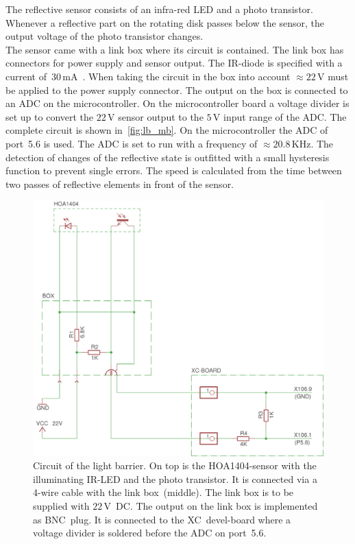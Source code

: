 \documentclass[12pt,a4paper]{article}
\begin{document}
The reflective sensor consists of an infra-red LED and a photo transistor.
Whenever a reflective part on the rotating disk passes below the sensor, the output voltage of the photo transistor changes.\\
The sensor came with a link box where its circuit is contained.
The link box has connectors for power supply and sensor output.
The IR-diode is specified with a current of~$30\,$mA~\cite{hoa}.
When taking the circuit in the box into account $\approx 22$\,V must be applied to the power supply connector.
The output on the box is connected to an ADC on the microcontroller.
On the microcontroller board a voltage divider is set up to convert the $22\,$V sensor output to the $5\,$V input range of the ADC.
The complete circuit is shown in~\autoref{fig:lb_mb}.
On the microcontroller the ADC of port~5.6 is used. 
The ADC is set to run with a frequency of $\approx 20.8$\,KHz.
The detection of changes of the reflective state is outfitted with a small hysteresis function to prevent single errors.
The speed is calculated from the time between two passes of reflective elements in front of the sensor.

\begin{figure}[htbp]
\begin{center}
\includegraphics[width=\textwidth]{figures/light_barrier_sch.png}
\caption{\label{fig:lb_mb}
Circuit of the light barrier.
On top is the HOA1404-sensor with the illuminating IR-LED and the photo transistor. 
It is connected via a 4-wire cable with the link box~(middle).
The link box is to be supplied with $22\,$V~DC.
The output on the link box is implemented as BNC~plug.
It is connected to the XC~devel-board where a voltage divider is soldered before the ADC on port~5.6.
}
\end{center}
\end{figure}
\end{document}
